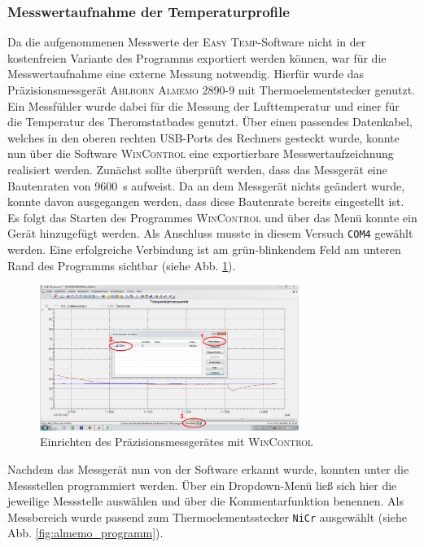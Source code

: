 \documentclass[a4paper, 11pt, draft=false]{scrartcl}
\begin{document}
	\subsubsection*{Messwertaufnahme der Temperaturprofile}
	Da die aufgenommenen Messwerte der \textsc{Easy Temp}-Software nicht in der kostenfreien Variante des Programms exportiert werden können, war für die Messwertaufnahme eine externe Messung notwendig. Hierfür wurde das Präzisionsmessgerät \textsc{Ahlborn Almemo 2890-9} mit Thermoelementstecker genutzt. Ein Messfühler wurde dabei für die Messung der Lufttemperatur und einer für die Temperatur des Theromstatbades genutzt. Über einen passendes Datenkabel, welches in den oberen rechten USB-Ports des Rechners gesteckt wurde, konnte nun über die Software \textsc{WinControl} eine exportierbare Messwertaufzeichnung realisiert werden.
	Zunächst sollte überprüft werden, dass das Messgerät eine Bautenraten von \SI{9600}{\second} aufweist. Da an dem Messgerät nichts geändert wurde, konnte davon ausgegangen werden, dass diese Bautenrate bereits eingestellt ist. Es folgt das Starten des Programmes \textsc{WinControl} und über das Menü  konnte ein Gerät hinzugefügt werden. Als Anschluss musste in diesem Versuch \texttt{COM4} gewählt werden. Eine erfolgreiche Verbindung ist am grün-blinkendem Feld am unteren Rand des Programms sichtbar (siehe Abb. \ref{fig:almemo_gerat}).
	
	\begin{figure}[h!]
		\centering
		\includegraphics[width=0.75\textwidth]{img/almemo_1}
		\caption{Einrichten des Präzisionsmessgerätes mit \textsc{WinControl}}
		\label{fig:almemo_gerat}
	\end{figure}
	\FloatBarrier
	
	Nachdem das Messgerät nun von der Software erkannt wurde, konnten unter  die Messstellen programmiert werden. Über ein Dropdown-Menü ließ sich hier die jeweilige Messstelle auswählen und über die Kommentarfunktion benennen. Als Messbereich wurde passend zum Thermoelementsstecker \texttt{NiCr} ausgewählt (siehe Abb. \ref{fig:almemo_programm}).
	
\end{document}
